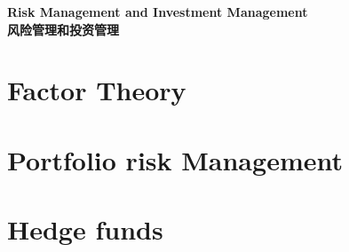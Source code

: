 \documentclass{article}
\begin{document}

\graphicspath{{images/}}

\begin{center}
\textbf{\Huge Risk Management and Investment Management}\\
\textbf{\Huge 风险管理和投资管理}\\
\end{center}
\section{Factor Theory}


\section{Portfolio risk Management}


\section{Hedge funds}


%

%

%
\end{document}
